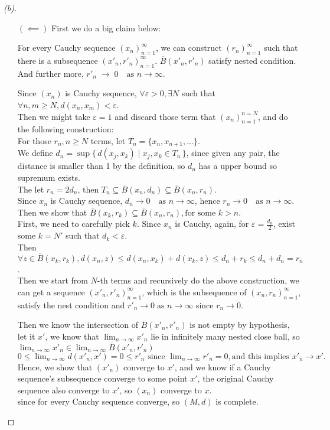 \begin{proof}[(b)]
\begin{itemize}
        \item [\((\impliedby )\)] First we do a big claim below:
        \begin{claim}
            For every Cauchy sequence $(x_n)_{n=1}^\infty$, we can construct $(r_n)_{n=1}^\infty$ such that there is a subsequence $(x'_n, r'_n)_{n=1}^\infty$.
            $\overline{B}(x'_n,r'_n)$ satisfy nested condition. And further more, $r'_n \;\to\; 0 \quad\text{as } n\to\infty$.
        \end{claim}
        \begin{explanation}
            Since $(x_n)$ is Cauchy sequence, $\forall \varepsilon > 0, \exists N$ such that $\forall n, m \geq N, d(x_n,x_m) < \varepsilon$. \\
            Then we might take $\varepsilon = 1$ and discard those term that $(x_n)_{n=1}^{n=N}$, and do the following construction:\\
            For those $r_n, n \geq N$ terms, let $T_n = \{x_n, x_{n+1}, ...\}$. \\
            We define $d_n = \sup \{\, d(x_j,x_k) \mid x_j,x_k \in T_n \,\}$, since given any pair, the distance is smaller than 1 by the definition, so $d_n$ has a upper bound so supremum exists. \\
            The let $r_n = 2d_n$, then $T_n \subseteq \overline{B}(x_n,d_n) \subseteq \overline{B}(x_n,r_n)$. \\
            Since $x_n$ is Cauchy sequence, $d_n \to 0 \quad\text{as } n\to\infty$, hence $r_n \to 0 \quad\text{as } n\to\infty$.
            Then we show that $\overline{B}(x_k,r_k) \subseteq \overline{B}(x_n,r_n) , \text{for some } k > n$. \\
            First, we need to carefully pick $k$. Since $x_n$ is Cauchy, again, for $\varepsilon = \frac{d_n}{2}$, exist some $k = N'$ such that $d_k < \varepsilon$. \\
            Then $\forall z \in \overline{B}(x_k,r_k), d(x_n, z) \leq d(x_n, x_k) + d(x_k, z) \leq d_n + r_k \leq d_n + d_n = r_n$. \\
            Then we start from $N$-th terms and recursively do the above construction, we can get a sequence $(x'_n, r'_n)_{n=1}^\infty$, which is the subsequence of $(x_n, r_n)_{n=1}^\infty$, satisfy the nest condition and $r'_n \to 0 \;\text{as } n\to\infty$ since $r_n \to 0$.
        \end{explanation}
        Then we know the intersection of $\overline{B}(x'_n,r'_n)$ is not empty by hypothesis, let it $x'$, we know that $\lim_{n \to \infty} x'_n$ lie in infinitely many nested close ball, so $\lim_{n \to \infty} x'_n \in \lim_{n \to \infty} \overline{B}(x'_n,r'_n)$ $0 \leq \lim_{n \to \infty} d(x'_n, x') = 0 \leq r'_n \text{ since } \lim_{n \to \infty} r'_n = 0,\text{and this implies } x'_n \to x'.$
        Hence, we show that $(x'_n)$ converge to $x'$, and we know if a Cauchy sequence's subsequence converge to some point $x'$, the original Cauchy sequence also converge to $x'$, so $(x_n)$ converge to $x$.\\
        since for every Cauchy sequence converge, so $(M,d)$ is complete.
        
    \end{itemize}
\end{proof}